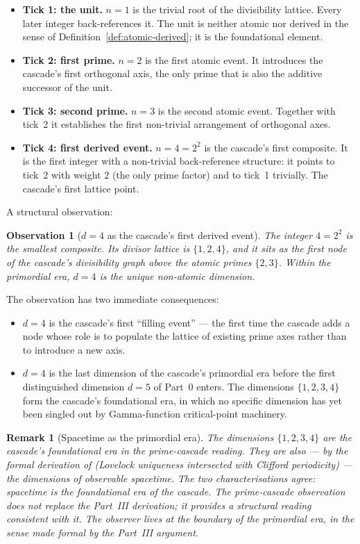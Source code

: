 \documentclass[11pt,a4paper]{article}
\newtheorem{remark}[theorem]{Remark}
\newtheorem{observation}[theorem]{Observation}
\begin{document}
\begin{itemize}
\item \textbf{Tick 1: the unit.} $n = 1$ is the trivial root of the
divisibility lattice. Every later integer back-references it. The
unit is neither atomic nor derived in the sense of
Definition~\ref{def:atomic-derived}; it is the foundational element.
\item \textbf{Tick 2: first prime.} $n = 2$ is the first atomic
event. It introduces the cascade's first orthogonal axis, the only
prime that is also the additive successor of the unit.
\item \textbf{Tick 3: second prime.} $n = 3$ is the second atomic
event. Together with tick~2 it establishes the first non-trivial
arrangement of orthogonal axes.
\item \textbf{Tick 4: first derived event.} $n = 4 = 2^2$ is the
cascade's first composite. It is the first integer with a
non-trivial back-reference structure: it points to tick~2 with
weight $2$ (the only prime factor) and to tick~1 trivially. The
cascade's first lattice point.
\end{itemize}

\noindent A structural observation:

\begin{observation}[$d = 4$ as the cascade's first derived event]\label{obs:d4-first-derived}
The integer $4 = 2^2$ is the smallest composite. Its divisor lattice
is $\{1, 2, 4\}$, and it sits as the first node of the cascade's
divisibility graph above the atomic primes $\{2, 3\}$. Within the
primordial era, $d = 4$ is the unique non-atomic dimension.
\end{observation}

The observation has two immediate consequences:

\begin{itemize}
\item $d = 4$ is the cascade's first ``filling event'' --- the first
time the cascade adds a node whose role is to populate the lattice
of existing prime axes rather than to introduce a new axis.
\item $d = 4$ is the last dimension of the cascade's primordial era
before the first distinguished dimension $d = 5$ of Part~0 enters.
The dimensions $\{1, 2, 3, 4\}$ form the cascade's foundational
era, in which no specific dimension has yet been singled out by
Gamma-function critical-point machinery.
\end{itemize}

\begin{remark}[Spacetime as the primordial era]
The dimensions $\{1, 2, 3, 4\}$ are the cascade's foundational era
in the prime-cascade reading. They are also --- by the formal
derivation of  (Lovelock uniqueness intersected
with Clifford periodicity) --- the dimensions of observable
spacetime. The two characterisations agree: spacetime is the
foundational era of the cascade. The prime-cascade observation does
not replace the Part~III derivation; it provides a structural
reading consistent with it. The observer lives at the boundary of the
primordial era, in the sense made formal by the Part~III argument.
\end{remark}
\end{document}
